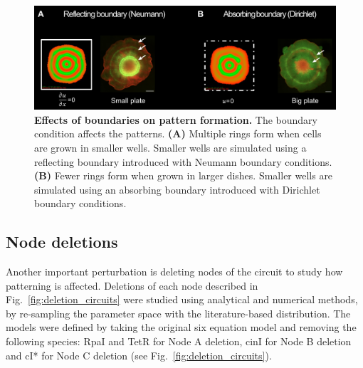 \begin{figure}[H] %
    \centering
    \begin{adjustbox}{center}
        \includegraphics[width=1\textwidth]{chapters/Chapter 3/boundary_conditions_colony} %
    \end{adjustbox}
    \caption{\textbf{Effects of boundaries on pattern formation.} The boundary condition affects the patterns. \textbf{(A)} Multiple rings form when cells are grown in smaller wells. Smaller wells are simulated using a reflecting boundary introduced with Neumann boundary conditions. \textbf{(B)} Fewer rings form when grown in larger dishes. Smaller wells are simulated using an absorbing boundary introduced with Dirichlet boundary conditions.}
    \label{fig:boundary_conditions_colony}
\end{figure}

\subsection{Node deletions}
Another important perturbation is deleting nodes of the circuit to study how patterning is affected.
Deletions of each node described in Fig.~\ref{fig:deletion_circuits} were studied using analytical and numerical methods, by re-sampling the parameter space with the literature-based distribution.
The models were defined by taking the original six equation model and removing the following species: RpaI and TetR for Node A deletion, cinI for Node B deletion and cI* for Node C deletion (see Fig.~\ref{fig:deletion_circuits}).

